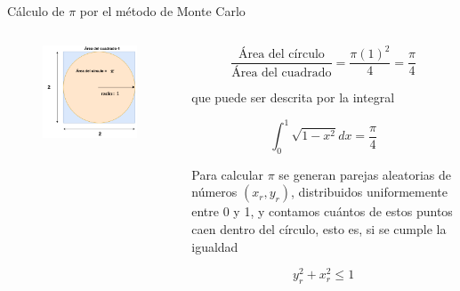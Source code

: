 \documentclass[11pt]{beamer}
\begin{document}
\begin{frame}{Cálculo de $\pi$ por el método de Monte Carlo \citep{wilkinson1998}}\scriptsize

	\begin{columns}
		\begin{column}{0.5\textwidth}
			\begin{figure}
				\includegraphics[scale=0.5]{images/pi-monte-carlo.pdf}
			\end{figure}
		\end{column}
		\begin{column}{0.5\textwidth}
		\[\dfrac{\text{Área del círculo}}{\text{Área del cuadrado}} = \dfrac{\pi(1)^2}{4}=\dfrac{\pi}{4}\]
		
		que puede ser descrita por la integral
		
		\[\int_0^1 \sqrt{1-x^2} dx = \dfrac{\pi}{4}\]
		
		Para calcular $\pi$ se generan parejas aleatorias de números $(x_r,y_r)$, distribuidos uniformemente entre 0 y 1, y contamos cuántos de estos puntos caen dentro del círculo, esto es, si se cumple la igualdad 
		
		\[y_r^2 + x_r^2 \leq 1\]
		\end{column}

	\end{columns}
\end{frame}
\end{document}
